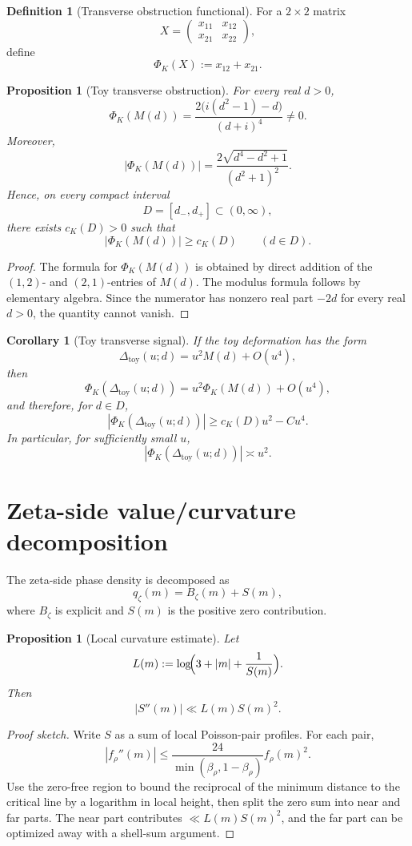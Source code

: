\documentclass[11pt]{article}
\theoremstyle{plain}
\newtheorem{proposition}[theorem]{Proposition}
\newtheorem{corollary}[theorem]{Corollary}
\theoremstyle{definition}
\newtheorem{definition}[theorem]{Definition}
\newcommand{\toy}{\mathrm{toy}}
\newcommand{\cK}{c_K}
\newcommand{\abs}[1]{\left\lvert #1\right\rvert}
\begin{document}
\begin{definition}[Transverse obstruction functional]
For a $2\times2$ matrix
\[
X=
\begin{pmatrix}
x_{11}&x_{12}\\x_{21}&x_{22}
\end{pmatrix},
\]
define
\[
\Phi_K(X):=x_{12}+x_{21}.
\]
\end{definition}

\begin{proposition}[Toy transverse obstruction]
For every real $d>0$,
\[
\Phi_K(M(d))
=
\frac{2\bigl(i(d^2-1)-d\bigr)}{(d+i)^4}
\neq 0.
\]
Moreover,
\[
\abs{\Phi_K(M(d))}
=
\frac{2\sqrt{d^4-d^2+1}}{(d^2+1)^2}.
\]
Hence, on every compact interval
\[
D=[d_-,d_+]\subset(0,\infty),
\]
there exists $\cK(D)>0$ such that
\[
\abs{\Phi_K(M(d))}\ge \cK(D)
\qquad(d\in D).
\]
\end{proposition}

\begin{proof}
The formula for $\Phi_K(M(d))$ is obtained by direct addition of the $(1,2)$- and $(2,1)$-entries of $M(d)$. The modulus formula follows by elementary algebra. Since the numerator has nonzero real part $-2d$ for every real $d>0$, the quantity cannot vanish.
\end{proof}

\begin{corollary}[Toy transverse signal]
If the toy deformation has the form
\[
\Delta_\toy(u;d)=u^2M(d)+O(u^4),
\]
then
\[
\Phi_K(\Delta_\toy(u;d))=u^2\Phi_K(M(d))+O(u^4),
\]
and therefore, for $d\in D$,
\[
\abs{\Phi_K(\Delta_\toy(u;d))}\ge \cK(D)u^2-Cu^4.
\]
In particular, for sufficiently small $u$,
\[
\abs{\Phi_K(\Delta_\toy(u;d))}\asymp u^2.
\]
\end{corollary}

\section{Zeta-side value/curvature decomposition}

The zeta-side phase density is decomposed as
\[
q_\zeta(m)=B_\zeta(m)+S(m),
\]
where $B_\zeta$ is explicit and $S(m)$ is the positive zero contribution.

\begin{proposition}[Local curvature estimate]
Let
\[
L(m):=\log\!\Bigl(3+\abs{m}+\frac1{S(m)}\Bigr).
\]
Then
\[
\abs{S''(m)}\ll L(m)S(m)^2.
\]
\end{proposition}

\begin{proof}[Proof sketch]
Write $S$ as a sum of local Poisson-pair profiles. For each pair,
\[
\abs{f_\rho''(m)}\le \frac{24}{\min(\beta_\rho,1-\beta_\rho)}f_\rho(m)^2.
\]
Use the zero-free region to bound the reciprocal of the minimum distance to the critical line by a logarithm in local height, then split the zero sum into near and far parts. The near part contributes $\ll L(m)S(m)^2$, and the far part can be optimized away with a shell-sum argument.
\end{proof}
\end{document}
